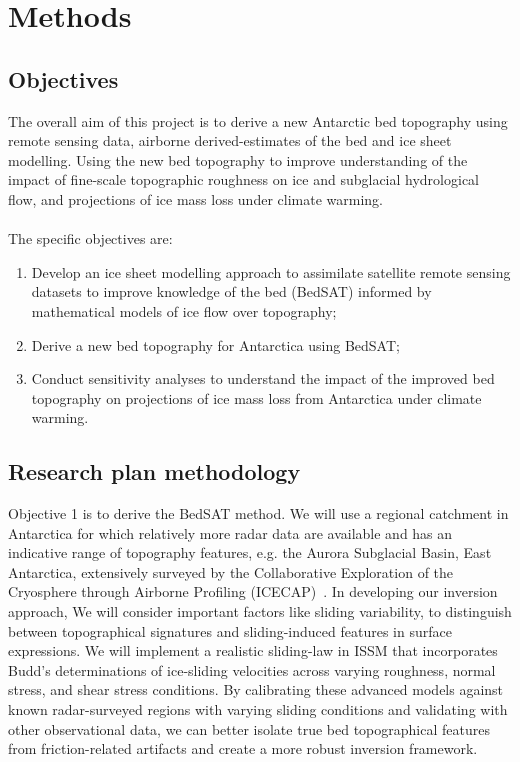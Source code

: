 \chapter{Methods}
\section{Objectives}

The overall aim of this project is to derive a new Antarctic bed topography using remote sensing data, airborne derived-estimates of the bed and ice sheet modelling. Using the new bed topography to improve understanding of the impact of fine-scale topographic roughness on ice and subglacial hydrological flow, and projections of ice mass loss under climate warming.\\
\\The specific objectives are:
\begin{enumerate}
    \item Develop an ice sheet modelling approach to assimilate satellite remote sensing datasets to improve knowledge of the bed (BedSAT) informed by mathematical models of ice flow over topography;
    \item Derive a new bed topography for Antarctica using BedSAT;
    \item Conduct sensitivity analyses to understand the impact of the improved bed topography on projections of ice mass loss from Antarctica under climate warming.
\end{enumerate}

\section{Research plan methodology}

Objective 1 is to derive the BedSAT method. We will use a regional catchment in Antarctica for which relatively more radar data are available and has an indicative range of topography features, e.g. the Aurora Subglacial Basin, East Antarctica, extensively surveyed by the Collaborative Exploration of the Cryosphere through Airborne Profiling (ICECAP)~\cite{Young_2011}. In developing our inversion approach, We will consider important factors like sliding variability, to distinguish between topographical signatures and sliding-induced features in surface expressions. We will implement a realistic sliding-law in ISSM that incorporates Budd's  determinations of ice-sliding velocities across varying roughness, normal stress, and shear stress conditions. By calibrating these advanced models against known radar-surveyed regions with varying sliding conditions and validating with other observational data, we can better isolate true bed topographical features from friction-related artifacts and create a more robust inversion framework.


